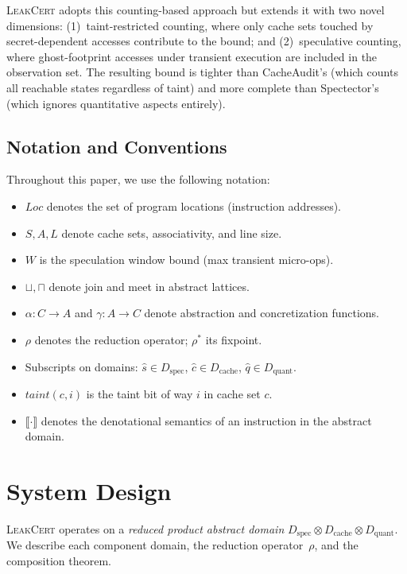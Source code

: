 \documentclass{article}
\theoremstyle{definition}
\theoremstyle{remark}
\newcommand{\Dspec}{D_{\text{spec}}}
\newcommand{\Dcache}{D_{\text{cache}}}
\newcommand{\Dquant}{D_{\text{quant}}}
\begin{document}
\textsc{LeakCert} adopts this counting-based approach but extends it with two
novel dimensions: (1)~taint-restricted counting, where only cache sets touched
by secret-dependent accesses contribute to the bound; and (2)~speculative
counting, where ghost-footprint accesses under transient execution are included
in the observation set.  The resulting bound is tighter than CacheAudit's
(which counts all reachable states regardless of taint) and more complete than
Spectector's (which ignores quantitative aspects entirely).

\subsection{Notation and Conventions}
\label{sec:bg-notation}

Throughout this paper, we use the following notation:
\begin{itemize}[nosep]
  \item $\mathit{Loc}$ denotes the set of program locations (instruction addresses).
  \item $S, A, L$ denote cache sets, associativity, and line size.
  \item $W$ is the speculation window bound (max transient micro-ops).
  \item $\sqcup, \sqcap$ denote join and meet in abstract lattices.
  \item $\alpha : C \to A$ and $\gamma : A \to C$ denote abstraction and
        concretization functions.
  \item $\rho$ denotes the reduction operator; $\rho^*$ its fixpoint.
  \item Subscripts on domains: $\hat{s} \in \Dspec$, $\hat{c} \in \Dcache$,
        $\hat{q} \in \Dquant$.
  \item $\mathit{taint}(c, i)$ is the taint bit of way $i$ in cache set $c$.
  \item $\llbracket \cdot \rrbracket$ denotes the denotational semantics of
        an instruction in the abstract domain.
\end{itemize}

\section{System Design}
\label{sec:design}

\textsc{LeakCert} operates on a \emph{reduced product abstract domain}
$\Dspec \otimes \Dcache \otimes \Dquant$.  We describe each component domain,
the reduction operator~$\rho$, and the composition theorem.
\end{document}
